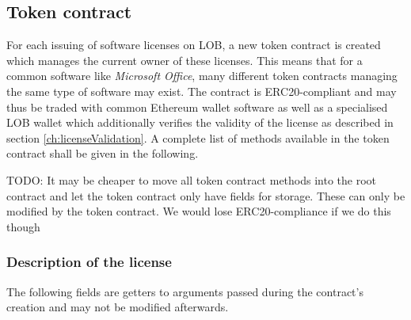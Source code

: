 \documentclass[a4paper]{article}
\newcommand{\todo}[1]{\textsf{TODO: #1}}
\begin{document}
\subsection{Token contract}
\label{ch:tokenContract}

For each issuing of software licenses on LOB, a new token contract is created which manages the current owner of these licenses. This means that for a common software like \emph{Microsoft Office}, many different token contracts managing the same type of software may exist. The contract is ERC20-compliant and may thus be traded with common Ethereum wallet software as well as a specialised LOB wallet which additionally verifies the validity of the license as described in section \ref{ch:licenseValidation}. A complete list of methods available in the token contract shall be given in the following.

\todo{It may be cheaper to move all token contract methods into the root contract and let the token contract only have fields for storage. These can only be modified by the token contract. We would lose ERC20-compliance if we do this though}

\subsubsection{Description of the license}

The following fields are getters to arguments passed during the contract's creation and may not be modified afterwards.
\end{document}
